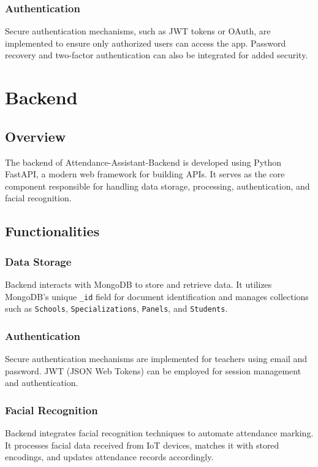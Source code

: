 \documentclass[conference]{IEEEtran}
\begin{document}
\subsubsection{Authentication}
Secure authentication mechanisms, such as JWT tokens or OAuth, are implemented to ensure only authorized users can access the app. Password recovery and two-factor authentication can also be integrated for added security.


\section{Backend}
\subsection{Overview}
The backend of Attendance-Assistant-Backend is developed using Python FastAPI, a modern web framework for building APIs. It serves as the core component responsible for handling data storage, processing, authentication, and facial recognition.

\subsection{Functionalities}
\subsubsection{Data Storage}
Backend interacts with MongoDB to store and retrieve data. It utilizes MongoDB's unique \texttt{\_id} field for document identification and manages collections such as \texttt{Schools}, \texttt{Specializations}, \texttt{Panels}, and \texttt{Students}.

\subsubsection{Authentication}
Secure authentication mechanisms are implemented for teachers using email and password. JWT (JSON Web Tokens) can be employed for session management and authentication.

\subsubsection{Facial Recognition}
Backend integrates facial recognition techniques to automate attendance marking. It processes facial data received from IoT devices, matches it with stored encodings, and updates attendance records accordingly.
\end{document}
